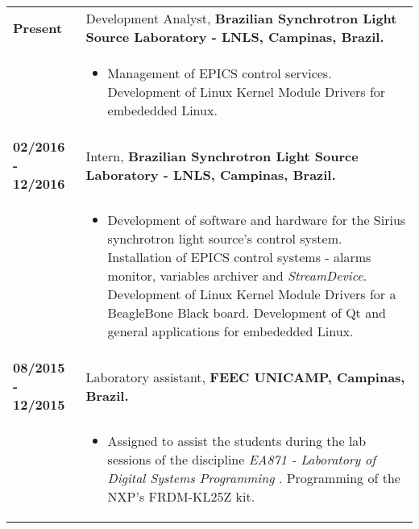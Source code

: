 \documentclass[10pt, a4paper]{article}
\begin{document}
\begin{tabular}{p{} p{}}

\textbf{Present}  & Development Analyst, \textbf{Brazilian Synchrotron Light
Source Laboratory - LNLS, Campinas, Brazil.}
\\
  & \vspace{-12pt}
  \begin{itemize}
    \item Management of EPICS
    control services. Development of Linux Kernel Module Drivers for embededded Linux.
	\end{itemize}\\

\textbf{02/2016 - 12/2016}  & Intern, \textbf{Brazilian Synchrotron Light
Source Laboratory - LNLS, Campinas, Brazil.}
 \\
  & \vspace{-12pt}
  \begin{itemize}
    \item Development of software and hardware for the Sirius synchrotron light
    source's control system. Installation of EPICS
    control systems - alarms monitor, variables archiver and \textit{StreamDevice}.
    Development of Linux Kernel Module Drivers for a BeagleBone Black board.
    Development of Qt and general applications for embededded Linux.
    
	\end{itemize}\\

\textbf{08/2015 - 12/2015}  & Laboratory assistant, \textbf{FEEC
 UNICAMP, Campinas, Brazil.}
 \\
  & \vspace{-12pt}
  \begin{itemize}
    \item Assigned to assist the students during the lab sessions of the
    discipline \textit{EA871 - Laboratory of Digital Systems Programming
    }. Programming of the NXP's FRDM-KL25Z kit.
        
	\end{itemize}\\




\end{tabular}
\end{document}
